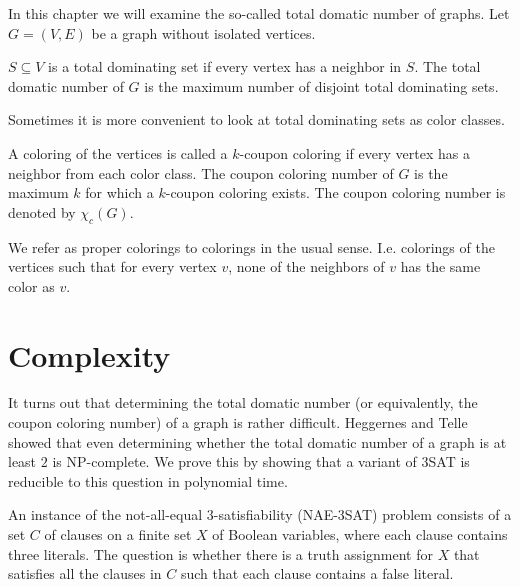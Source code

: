 In this chapter we will examine the so-called total domatic number of graphs.
Let $G = (V, E)$ be a graph without isolated vertices.

\begin{definition}
  $S \subseteq V$ is a total dominating set if every vertex has a neighbor in
  $S$. The total domatic number of $G$ is the maximum number of disjoint total
  dominating sets.
\end{definition}

Sometimes it is more convenient to look at total dominating sets as color classes.

\begin{definition}
  A coloring of the vertices is called a $k$-coupon coloring if every vertex
  has a neighbor from each color class. The coupon coloring number of $G$ is
  the maximum $k$ for which a $k$-coupon coloring exists. The coupon coloring
  number is denoted by $\chi_c(G)$.
\end{definition}

\begin{remark}
  We refer as proper colorings to colorings in the usual sense. I.e. colorings of
  the vertices such that for every vertex $v$, none of the neighbors of $v$ has the
  same color as $v$.
\end{remark}

\section{Complexity}

It turns out that determining the total domatic number (or equivalently, the
coupon coloring number) of a graph is rather difficult. Heggernes and Telle \cite{np-complete}
showed that even determining whether the total
domatic number of a graph is at least $2$ is NP-complete. We prove this by showing
that a variant of 3SAT is reducible to this question in polynomial time.

\begin{definition}
  An instance of the not-all-equal 3-satisfiability (NAE-3SAT) problem consists of
  a set $C$ of clauses on a finite set $X$ of Boolean variables, where each clause
  contains three literals. The question is whether there is a truth assignment for
  $X$ that satisfies all the clauses in $C$ such that each clause contains a false
  literal.
\end{definition}

